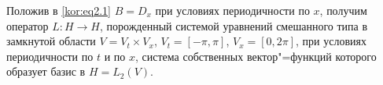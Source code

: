\smallskip



\begin{example} Положив в \eqref{kor:eq2.1} $B=D_x$ при условиях периодичности по $x$, получим оператор $L:H\to H$, порожденный системой уравнений смешанного типа в замкнутой области $V=V_t\times V_x$, $V_t=[-\pi,\pi]$, $V_x=[0,2\pi]$, при условиях периодичности по $t$ и по $x$, система собственных вектор"=функций которого образует базис в $H=L_2(V)$.

\end{example}















